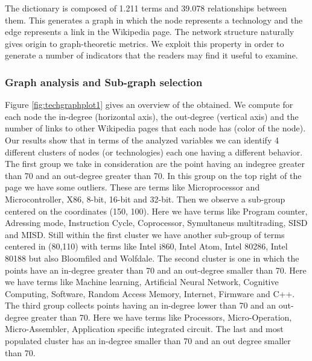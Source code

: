 \documentclass[b5paper,]{book}
\theoremstyle{definition}
\theoremstyle{definition}
\theoremstyle{definition}
\theoremstyle{remark}
\begin{document}
The dictionary is composed of 1.211 terms and 39.078 relationships
between them. This generates a graph in which the node represents a
technology and the edge represents a link in the Wikipedia page. The
network structure naturally gives origin to graph-theoretic metrics. We
exploit this property in order to generate a number of indicators that
the readers may find it useful to examine.

\subsubsection*{Graph analysis and Sub-graph
selection}\label{graph-analysis-and-sub-graph-selection}

Figure \ref{fig:techgraphplot1} gives an overview of the obtained. We
compute for each node the in-degree (horizontal axis), the out-degree
(vertical axis) and the number of links to other Wikipedia pages that
each node has (color of the node). Our results show that in terms of the
analyzed variables we can identify 4 different clusters of nodes (or
technologies) each one having a different behavior. The first group we
take in consideration are the point having an indegree greater than 70
and an out-degree greater than 70. In this group on the top right of the
page we have some outliers. These are terms like Microprocessor and
Microcontroller, X86, 8-bit, 16-bit and 32-bit. Then we observe a
sub-group centered on the coordinates (150, 100). Here we have terms
like Program counter, Adressing mode, Instruction Cycle, Coprocessor,
Symultaneus multitrading, SISD and MISD. Still within the first cluster
we have another sub-group of terms centered in (80,110) with terms like
Intel i860, Intel Atom, Intel 80286, Intel 80188 but also Bloomfiled and
Wolfdale. The second cluster is one in which the points have an
in-degree greater than 70 and an out-degree smaller than 70. Here we
have terms like Machine learning, Artificial Neural Network, Cognitive
Computing, Software, Random Access Memory, Internet, Firmware and C++.
The third group collects points having an in-degree lower than 70 and an
out-degree greater than 70. Here we have terms like Processors,
Micro-Operation, Micro-Assembler, Application specific integrated
circuit. The last and most populated cluster has an in-degree smaller
than 70 and an out degree smaller than 70.
\end{document}

